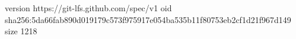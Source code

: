 version https://git-lfs.github.com/spec/v1
oid sha256:5da66fab890d019179c573f975917e054ba535b11f80753eb2cf1d21f967d149
size 1218
